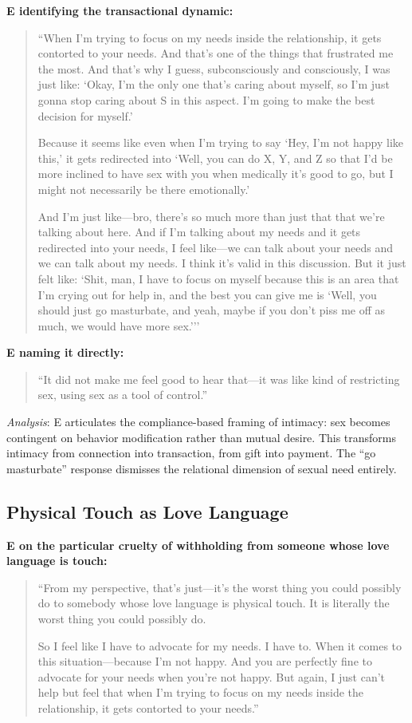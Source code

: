 \documentclass[12pt,openany]{book}
\numberwithin{equation}{chapter}
\begin{document}
\textbf{E identifying the transactional dynamic:}
\begin{quote}
``When I'm trying to focus on my needs inside the relationship, it gets contorted to your needs. And that's one of the things that frustrated me the most. And that's why I guess, subconsciously and consciously, I was just like: `Okay, I'm the only one that's caring about myself, so I'm just gonna stop caring about S in this aspect. I'm going to make the best decision for myself.'

Because it seems like even when I'm trying to say `Hey, I'm not happy like this,' it gets redirected into `Well, you can do X, Y, and Z so that I'd be more inclined to have sex with you when medically it's good to go, but I might not necessarily be there emotionally.'

And I'm just like---bro, there's so much more than just that that we're talking about here. And if I'm talking about my needs and it gets redirected into your needs, I feel like---we can talk about your needs and we can talk about my needs. I think it's valid in this discussion. But it just felt like: `Shit, man, I have to focus on myself because this is an area that I'm crying out for help in, and the best you can give me is `Well, you should just go masturbate, and yeah, maybe if you don't piss me off as much, we would have more sex.'''
\end{quote}

\textbf{E naming it directly:}
\begin{quote}
``It did not make me feel good to hear that---it was like kind of restricting sex, using sex as a tool of control.''
\end{quote}

\textit{Analysis}: E articulates the compliance-based framing of intimacy: sex becomes contingent on behavior modification rather than mutual desire. This transforms intimacy from connection into transaction, from gift into payment. The ``go masturbate'' response dismisses the relational dimension of sexual need entirely.

\subsection{Physical Touch as Love Language}

\textbf{E on the particular cruelty of withholding from someone whose love language is touch:}
\begin{quote}
``From my perspective, that's just---it's the worst thing you could possibly do to somebody whose love language is physical touch. It is literally the worst thing you could possibly do.

So I feel like I have to advocate for my needs. I have to. When it comes to this situation---because I'm not happy. And you are perfectly fine to advocate for your needs when you're not happy. But again, I just can't help but feel that when I'm trying to focus on my needs inside the relationship, it gets contorted to your needs.''
\end{quote}
\end{document}
